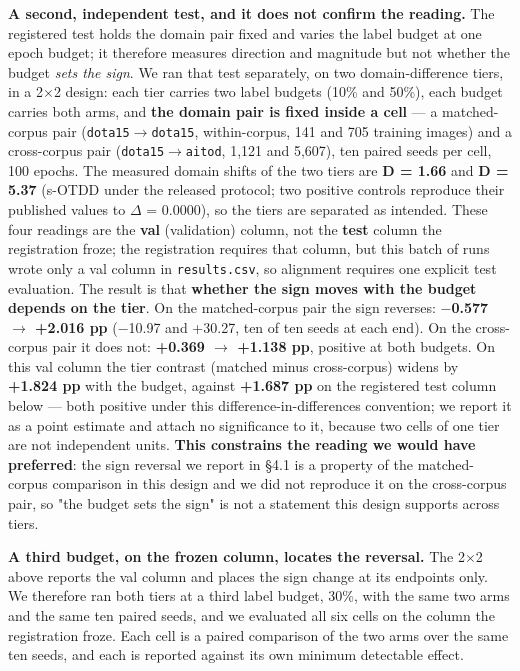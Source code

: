 \documentclass[pdflatex,sn-mathphys-ay]{sn-jnl}
\begin{document}
\textbf{A second, independent test, and it does not confirm the reading.} The registered test holds the domain pair fixed and varies the label budget at one epoch budget; it therefore measures direction and magnitude but not whether the budget \emph{sets the sign}. We ran that test separately, on two domain-difference tiers, in a 2\ensuremath{\times}2 design: each tier carries two label budgets (10\% and 50\%), each budget carries both arms, and \textbf{the domain pair is fixed inside a cell} --- a matched-corpus pair (\texttt{dota15\ensuremath{\rightarrow}dota15}, within-corpus, 141 and 705 training images) and a cross-corpus pair (\texttt{dota15\ensuremath{\rightarrow}aitod}, 1,121 and 5,607), ten paired seeds per cell, 100 epochs. The measured domain shifts of the two tiers are \textbf{D = 1.66} and \textbf{D = 5.37} (s-OTDD under the released protocol; two positive controls reproduce their published values to \ensuremath{\Delta} = 0.0000), so the tiers are separated as intended. These four readings are the \textbf{val} (validation) column, not the \textbf{test} column the registration froze; the registration requires that column, but this batch of runs wrote only a val column in \texttt{results.csv}, so alignment requires one explicit test evaluation. The result is that \textbf{whether the sign moves with the budget depends on the tier}. On the matched-corpus pair the sign reverses: \textbf{\ensuremath{-}0.577 \ensuremath{\rightarrow} +2.016 pp} (\ensuremath{-}10.97 and +30.27, ten of ten seeds at each end). On the cross-corpus pair it does not: \textbf{+0.369 \ensuremath{\rightarrow} +1.138 pp}, positive at both budgets. On this val column the tier contrast (matched minus cross-corpus) widens by \textbf{+1.824 pp} with the budget, against \textbf{+1.687 pp} on the registered test column below --- both positive under this difference-in-differences convention; we report it as a point estimate and attach no significance to it, because two cells of one tier are not independent units. \textbf{This constrains the reading we would have preferred}: the sign reversal we report in \S{}4.1 is a property of the matched-corpus comparison in this design and we did not reproduce it on the cross-corpus pair, so "the budget sets the sign" is not a statement this design supports across tiers.

\textbf{A third budget, on the frozen column, locates the reversal.} The 2\ensuremath{\times}2 above reports the val column and places the sign change at its endpoints only. We therefore ran both tiers at a third label budget, 30\%, with the same two arms and the same ten paired seeds, and we evaluated all six cells on the column the registration froze. Each cell is a paired comparison of the two arms over the same ten seeds, and each is reported against its own minimum detectable effect.
\end{document}
